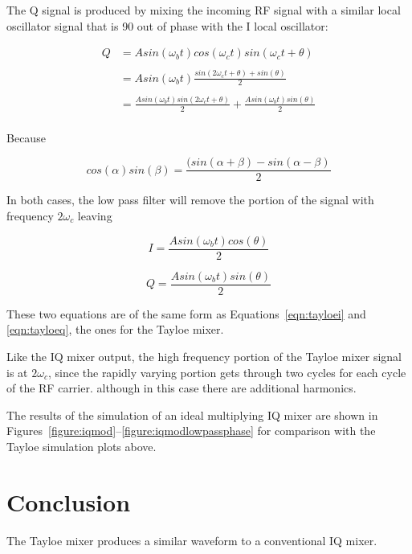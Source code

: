 \documentclass[11pt, twoside]{article}
\begin{document}
The Q signal is produced by mixing the incoming RF signal with a
similar local oscillator signal that is 90{\degree} out of phase with
the I local oscillator:


\begin{align*}
  Q& = A sin({\omega_b}t) cos({\omega}_ct) sin({\omega}_ct + \theta) \\
  \\
  & = A sin({\omega_b}t) \frac{sin(2{\omega}_ct + \theta) + sin(\theta)}{2}\\
  \\
& = \frac{A sin({\omega_b}t)sin(2{\omega}_ct + \theta)}{2} + \frac{A sin({\omega_b}t)sin(\theta)}{2}\\
\end{align*}

Because

\begin{equation*}
  cos(\alpha)sin(\beta) = \frac{(sin(\alpha + \beta) - sin(\alpha - \beta)}{2} 
\end{equation*}

In both cases, the low pass filter will remove the portion of the
signal with frequency $2{\omega_c}$ leaving

\begin{equation*}
  I = \frac{A sin({\omega_b}t)cos(\theta)}{2}
\end{equation*}

\begin{equation*}
  Q = \frac{A sin({\omega_b}t)sin(\theta)}{2}
\end{equation*}

These two equations are of the same form as
Equations~\ref{eqn:tayloei} and \ref{eqn:tayloeq}, the ones for the
Tayloe mixer.

Like the IQ mixer output, the high frequency portion of the Tayloe
mixer signal is at $2\omega_c$, since the rapidly varying portion gets
through two cycles for each cycle of the RF carrier.  although in this
case there are additional harmonics.

The results of the simulation of an ideal multiplying IQ mixer are
shown in Figures~\ref{figure:iqmod}--\ref{figure:iqmodlowpassphase}
for comparison with the Tayloe simulation plots above.

\section{Conclusion}

The Tayloe mixer produces a similar waveform to a conventional IQ
mixer.
\end{document}
